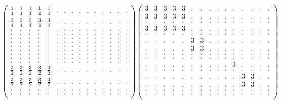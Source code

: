 \documentclass[12pt,a4paper]{amsart}
\begin{document}
\begin{align*}
\left(\begin{array}{rrrrrrrrrrrrrrr}%
\frac14&\frac14&\frac14&\frac14&\frac14&.&.&.&.&.&.&.&.&.&.\\%
\frac34&\frac34&\frac34&\frac34&\frac34&.&.&.&.&.&.&.&.&.&.\\%
.&.&.&.&.&.&.&.&.&.&.&.&.&.&.\\%
.&.&.&.&.&.&.&.&.&.&.&.&.&.&.\\%
.&.&.&.&.&.&.&.&.&.&.&.&.&.&.\\%
.&.&.&.&.&.&.&.&.&.&.&.&.&.&.\\%
.&.&.&.&.&.&.&.&.&.&.&.&.&.&.\\%
.&.&.&.&.&.&.&.&.&.&.&.&.&.&.\\%
.&.&.&.&.&.&.&.&.&.&.&.&.&.&.\\%
.&.&.&.&.&.&.&.&.&.&.&.&.&.&.\\%
.&.&.&.&.&.&.&.&.&.&.&.&.&.&.\\%
\frac32&\frac32&\frac32&\frac32&\frac32&.&.&.&.&.&.&.&.&.&.\\%
\frac32&\frac32&\frac32&\frac32&\frac32&.&.&.&.&.&.&.&.&.&.\\%
.&.&.&.&.&.&.&.&.&.&.&.&.&.&.\\%
.&.&.&.&.&.&.&.&.&.&.&.&.&.&.\\%
\end{array}\right)%
\left(\begin{array}{rrrrrrrrrrrrrrr}%
3&3&3&3&3&.&.&.&.&.&.&.&.&.&.\\%
3&3&3&3&3&.&.&.&.&.&.&.&.&.&.\\%
.&.&.&.&.&.&.&.&.&.&.&.&.&.&.\\%
3&3&3&3&3&.&.&.&.&.&.&.&.&.&.\\%
.&.&.&.&.&.&.&.&.&.&.&.&.&.&.\\%
.&.&.&.&.&3&3&.&.&.&.&.&.&.&.\\%
.&.&.&.&.&3&3&.&.&.&.&.&.&.&.\\%
.&.&.&.&.&.&.&.&.&.&.&.&.&.&.\\%
.&.&.&.&.&.&.&.&.&.&.&.&.&.&.\\%
.&.&.&.&.&.&.&.&.&.&3&.&.&.&.\\%
.&.&.&.&.&.&.&.&.&.&.&.&.&.&.\\%
.&.&.&.&.&.&.&.&.&.&.&3&3&.&.\\%
.&.&.&.&.&.&.&.&.&.&.&3&3&.&.\\%
.&.&.&.&.&.&.&.&.&.&.&.&.&.&.\\%
.&.&.&.&.&.&.&.&.&.&.&.&.&.&.\\%
\end{array}\right)%
\end{align*}
\end{document}
